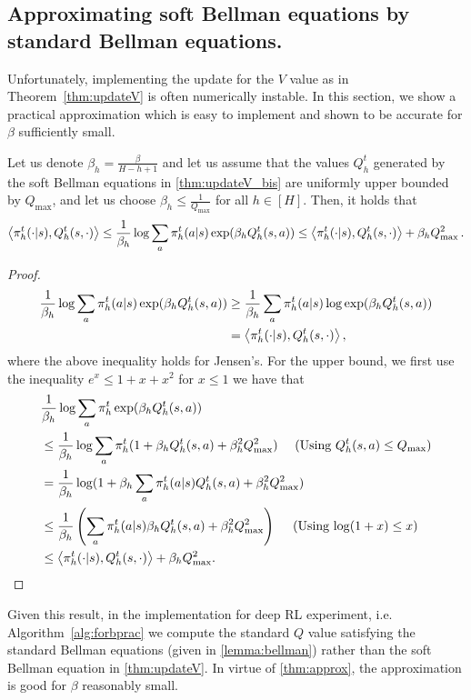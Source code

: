\subsection{Approximating soft Bellman equations by standard Bellman equations.}
\label{sebsec:approx_logistic_bellman_error}
Unfortunately, implementing the update for the $V$ value as in Theorem~\ref{thm:updateV} is often numerically instable. In this section, we show a practical approximation which is easy to implement and shown to be accurate for $\beta$ sufficiently small.
\begin{theorem}\label{thm:approx}
Let us denote $\beta_h = \frac{\beta}{H-h+1}$ and let us assume that the values $Q^t_h$ generated by the soft Bellman equations in \cref{thm:updateV_bis} are uniformly upper bounded by $Q_{\max}$, and let us choose $\beta_h \leq \frac{1}{Q_{\max}}$ for all $h\in[H]$. Then, it holds that
\begin{align*}
\left\langle{\pi^t_h(\cdot|s)},{Q^t_h(s,\cdot)}\right\rangle \leq \frac{1}{\beta_h} \log \sum_a \pi^t_h(a|s) \exp(\beta_h Q^t_h(s,a)) \leq \left\langle{\pi^t_h(\cdot|s)},{Q^t_h(s,\cdot)}\right\rangle + \beta_h Q^2_{\max}\,.
\end{align*}
\end{theorem}
\begin{proof}
\begin{align*}
\frac{1}{\beta_h} \log \sum_a \pi^t_h(a|s) \exp(\beta_h Q^t_h(s,a)) &\geq \frac{1}{\beta_h} \sum_{a}\pi^t_h(a|s) \log \exp (\beta_h Q^t_h(s,a) )
    \\ &= \left\langle{\pi^t_h(\cdot|s)},{Q^t_h(s,\cdot)}\right\rangle,
\end{align*}
where the above inequality holds for Jensen's. For the upper bound, we first use the inequality $e^x \leq 1 + x + x^2$ for $x \leq 1$ we have that
\begin{align*}
&\frac{1}{\beta_h} \log \sum_a \pi^t_h\exp(\beta_h Q^t_h(s,a)) \\&\leq \frac{1}{\beta_h} \log \sum_a \pi^t_h (1 + \beta_h Q^t_h(s,a) + \beta_h^2 Q_{\max}^2 ) \quad \text{ 
 (Using $Q^t_h(s,a) \leq Q_{\max}$)} \\
&= \frac{1}{\beta_h} \log (1 + \beta_h \sum_a \pi^t_h(a|s) Q^t_h(s,a) + \beta_h^2 Q_{\max}^2 ) \\& \leq 
\frac{1}{\beta_h} \left({ \sum_a \pi^t_h(a|s) \beta_h Q^t_h(s,a) + \beta_h^2 Q_{\max}^2 }\right) \quad \text{   (Using $\log(1 + x) \leq x$)}  \\&
\leq \left\langle{\pi^t_h(\cdot|s)},{Q^t_h(s,\cdot)}\right\rangle + \beta_h Q_{\max}^2 .
\end{align*}
\end{proof}
\begin{remark}
    Given this result, in the implementation for deep RL experiment, i.e. Algorithm~\ref{alg:forbprac} we compute the standard $Q$ value satisfying the standard Bellman equations (given in \cref{lemma:bellman}) rather than the soft Bellman equation in \cref{thm:updateV}. In virtue of \cref{thm:approx}, the approximation is good for $\beta$ reasonably small.
\end{remark}
